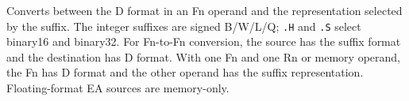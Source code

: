 Converts between the D format in an Fn operand and the representation selected by the suffix. The integer suffixes
are signed B/W/L/Q; \texttt{.H} and \texttt{.S} select binary16 and binary32. For Fn-to-Fn conversion, the source
has the suffix format and the destination has D format. With one Fn and one Rn or memory operand, the Fn has D
format and the other operand has the suffix representation. Floating-format EA sources are memory-only.
